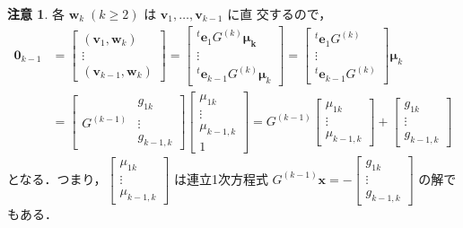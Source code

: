 \documentclass[11pt, uplatex, dvipdfmx]{jsarticle}
\theoremstyle{definition}
\newtheorem*{remark}{注意}
\begin{document}
\begin{remark}
  各 $\bm{w}_k \; (k \geq 2)$ は $\bm{v}_1, \ldots, \bm{v}_{k-1}$ に直
  交するので，
  \[
    \begin{aligned}
      \bm{0}_{k-1} &= \left[
        \begin{array}{c}
          (\bm{v}_1, \bm{w}_k)\\
          \vdots\\
          (\bm{v}_{k-1}, \bm{w}_k)
        \end{array}
      \right] = \left[
        \begin{array}{c}
          {}^{t}\bm{e}_1 G^{(k)} \bm{\mu_k}\\
          \vdots\\
          {}^{t} \bm{e}_{k-1} G^{(k)} \bm{\mu}_k
        \end{array}
      \right] = \left[
        \begin{array}{c}
          {}^{t}\bm{e}_1 G^{(k)}\\
          \vdots\\
          {}^{t}\bm{e}_{k-1}G^{(k)}
        \end{array}
      \right] \bm{\mu}_k\\
      &=\left[
        \begin{array}{cc}
          & g_{1k}\\
          G^{(k-1)} & \vdots \\
           & g_{k-1,k}
        \end{array}
      \right] \left[
        \begin{array}{c}
          \mu_{1k}\\
          \vdots\\
          \mu_{k-1,k}\\
          1
        \end{array}
      \right]
      = G^{(k-1)} \left[
        \begin{array}{c}
          \mu_{1k}\\
          \vdots \\
          \mu_{k-1,k}
        \end{array}
        \right] + \left[
          \begin{array}{c}
            g_{1k}\\
            \vdots\\
            g_{k-1,k}
          \end{array}
        \right]
    \end{aligned}
  \]
  となる．つまり，$\left[
    \begin{array}{c}
      \mu_{1k}\\
      \vdots\\
      \mu_{k-1,k}
    \end{array}
    \right]$ は連立1次方程式 $G^{(k-1)} \bm{x} = -\left[
      \begin{array}{c}
        g_{1k}\\
        \vdots\\
        g_{k-1,k}
      \end{array}
\right]$ の解でもある．
\end{remark}
\end{document}
